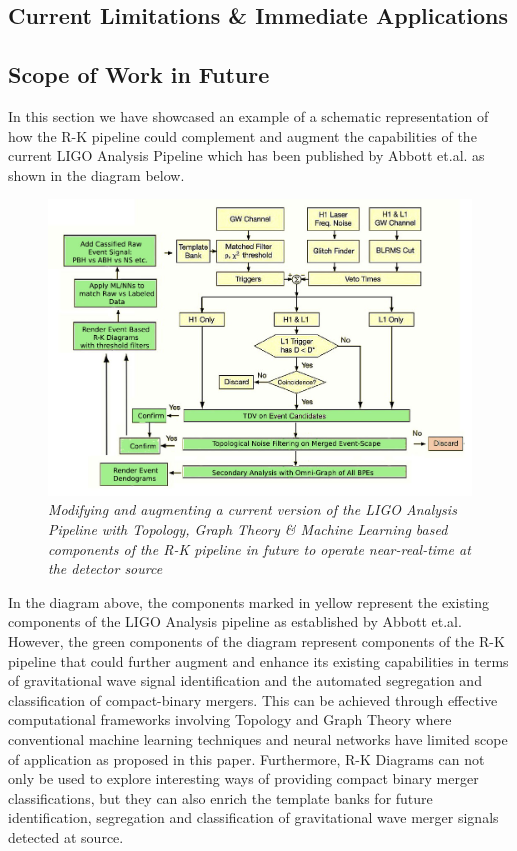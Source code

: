 \subsection{Current Limitations \& Immediate Applications}

\subsection{Scope of Work in Future}

In this section we have showcased an example of a schematic representation of how the R-K pipeline could complement and augment the capabilities of  the current LIGO Analysis Pipeline which has been published by Abbott et.al. \cite{00.6_LIGOAnalysisPipeline} as shown in the diagram below.

\begin{figure}[H]
	\centering
	\includegraphics[width=1.0\linewidth]{images/Modified-TDA-LIGO-Analysis-Pipeline.jpg}
	\caption{\textit{Modifying and augmenting a current version of the LIGO Analysis Pipeline with
			Topology, Graph Theory \& Machine Learning based components of the R-K pipeline in future to operate near-real-time at the detector source}}
	\label{fig:odified-TDA-LIGO-Analysis-Pipeline}
\end{figure}

In the diagram above, the components marked in yellow represent the existing components of the LIGO Analysis pipeline  as established by Abbott et.al.\cite{00.6_LIGOAnalysisPipeline} However, the green components of the diagram represent components of the R-K pipeline that could further augment and enhance its existing capabilities in terms of gravitational wave signal identification and the automated segregation and classification of compact-binary mergers. This can be achieved through effective computational frameworks involving Topology and Graph Theory where conventional machine learning techniques and neural networks have limited scope of application as proposed in this paper. Furthermore, R-K Diagrams can not only be used to explore  interesting ways of providing compact binary merger classifications, but they can also enrich the template banks for future identification, segregation and classification of gravitational wave merger signals detected at source.

